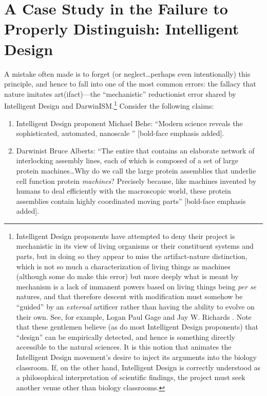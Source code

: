 \section[A Case Study]{A Case Study in the Failure to Properly Distinguish: Intelligent Design}

A mistake often made is to forget (or neglect\ldots perhaps even intentionally) this principle, and hence to fall into one of the most common errors: the fallacy that nature imitates art(ifact)---the ``mechanistic'' reductionist error shared by Intelligent Design and DarwinISM.\footnote{
Intelligent Design proponents have attempted to deny their project is mechanistic in its view of living organisms or their constituent systems and parts, but in doing so they appear to miss the artifact-nature distinction, which is not so much a characterization of living things as machines (although some do make this error) but more deeply what is meant by mechanism is a lack of immanent powers based on living things being \textit{per se} natures, and that therefore descent with modification must somehow be “guided” by an \textit{external} artificer rather than having the ability to evolve on their own. See, for example, Logan Paul Gage \citeyearpar{gage2010} and Jay W. Richards \citeyearpar{richards2010b}.
Note that these gentlemen believe (as do most Intelligent Design proponents) that “design” can be empirically detected, and hence is something directly accessible to the natural sciences. It is this notion that animates the Intelligent Design movement’s desire to inject its arguments into the biology classroom. If, on the other hand, Intelligent Design is correctly understood as a philosophical interpretation of scientific findings, the project must seek another venue other than biology classrooms.
} Consider the following claims:

\begin{enumerate}
\item {} Intelligent Design proponent Michael Behe: ``Modern science reveals the  sophisticated, automated, nanoscale '' \citep{beheinterview} [bold-face emphasis added].
\item {} Darwinist Bruce Alberts: ``The entire  that contains an elaborate network of interlocking assembly lines, each of which is composed of a set of large protein machines\ldots Why do we call the large protein assemblies that underlie cell function protein \emph{machines}? Precisely because, like machines invented by humans to deal efficiently with the macroscopic world, these protein assemblies contain highly coordinated moving parts'' \citep[][p.~291]{balberts} [bold-face emphasis added].
\end{enumerate}

